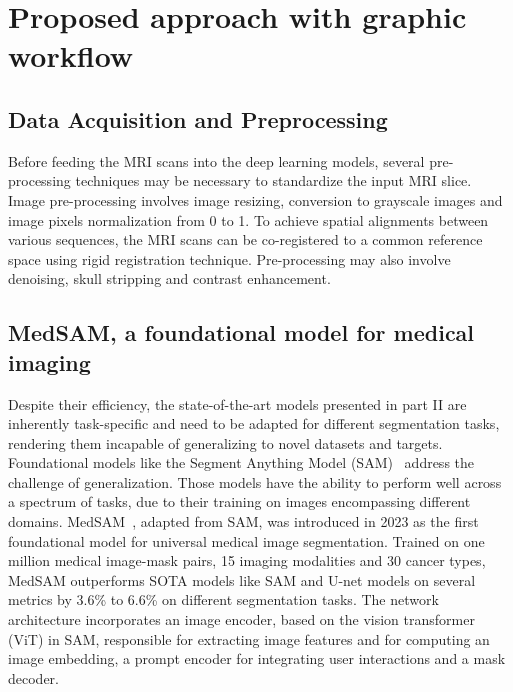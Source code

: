 \documentclass[11pt, journal, a4paper]{IEEEtran}
\begin{document}








\section{Proposed approach with graphic workflow}

\subsection{Data Acquisition and Preprocessing}

Before feeding the MRI scans into the deep learning models, several pre-processing techniques may be necessary to standardize the input MRI slice. Image pre-processing involves image resizing, conversion to grayscale images and image pixels normalization from 0 to 1. To achieve spatial alignments between various sequences, the MRI scans can be co-registered to a common reference space using rigid registration technique. Pre-processing may also involve denoising, skull stripping and contrast enhancement. 

\subsection{MedSAM, a foundational model for medical imaging}
Despite their efficiency, the state-of-the-art models presented in part II are inherently task-specific and need to be adapted for different segmentation tasks, rendering them incapable of generalizing to novel datasets and targets. Foundational models like the Segment Anything Model (SAM)~\cite{kirillov2023segment} address the challenge of generalization. Those models have the ability to perform well across a spectrum of tasks, due to their training on images encompassing different domains. MedSAM~\cite{ma2024segment}, adapted from SAM, was introduced in 2023 as the first foundational model for universal medical image segmentation. Trained on one million medical image-mask pairs, 15 imaging modalities and 30 cancer types, MedSAM outperforms SOTA models like SAM and U-net models on several metrics by 3.6\% to 6.6\% on different segmentation tasks. The network architecture incorporates an image encoder, based on the vision transformer (ViT) in SAM, responsible for extracting image features and for computing an image embedding, a prompt encoder for integrating user interactions and a mask decoder.
\end{document}
